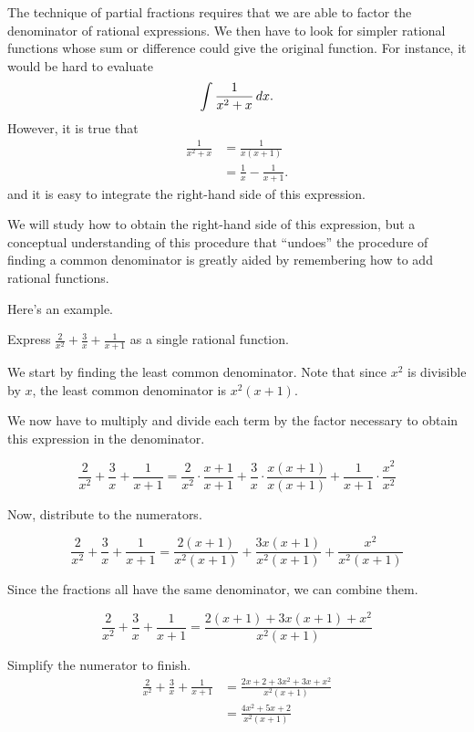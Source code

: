\documentclass{ximera}
\author{Jim Talamo}
\begin{document}
\begin{exercise}


The technique of partial fractions requires that we are able to
factor the denominator of rational expressions.  We then have to
look for simpler rational functions whose sum or difference could
give the original function.  For instance, it would be hard to
evaluate
\[
\int \frac{1}{x^2+x}\,d x.
\]
However, it is true that
\begin{align*}
\frac{1}{x^2+x} &= \frac{1}{x(x+1)}\\
&=\frac{1}{x}-\frac{1}{x+1}.
\end{align*}
and it is easy to integrate the right-hand side of this expression.

We will study how to obtain the right-hand side of this expression,
but a conceptual understanding of this procedure that ``undoes'' the
procedure of finding a common denominator is greatly aided by
remembering how to add rational functions.

Here's an example.

\begin{example}
Express $\frac{2}{x^2} + \frac{3}{x} + \frac{1}{x+1}$ as a single rational function.

\begin{explanation}
We start by finding the least common denominator.  Note that since $x^2$ is divisible by $x$, the least common denominator is $x^2(x+1)$.  

We now have to multiply and divide each term by the factor necessary to obtain this expression in the denominator.

\[
\frac{2}{x^2} + \frac{3}{x} + \frac{1}{x+1} = \frac{2}{x^2} \cdot \frac{x+1}{x+1}+ \frac{3}{x} \cdot \frac{x(x+1)}{x(x+1)} + \frac{1}{x+1}\cdot \frac{x^2}{x^2}
\]

Now, distribute to the numerators.

\[
\frac{2}{x^2} + \frac{3}{x} + \frac{1}{x+1} = \frac{2(x+1)}{x^2(x+1)} + \frac{3x(x+1)}{x^2(x+1)}  + \frac{x^2}{x^2(x+1)}
\]

Since the fractions all have the same denominator, we can combine them.

\[
\frac{2}{x^2} + \frac{3}{x} + \frac{1}{x+1} = \frac{2(x+1)+3x(x+1)+x^2}{x^2(x+1)}
\]

Simplify the numerator to finish.
\begin{align*}
\frac{2}{x^2} + \frac{3}{x} + \frac{1}{x+1} &= \frac{2x+2+3x^2+3x+x^2}{x^2(x+1)} \\
&= \frac{4x^2+5x+2}{x^2(x+1)}
\end{align*}


\end{explanation}
\end{example}
\end{exercise}
\end{document}
